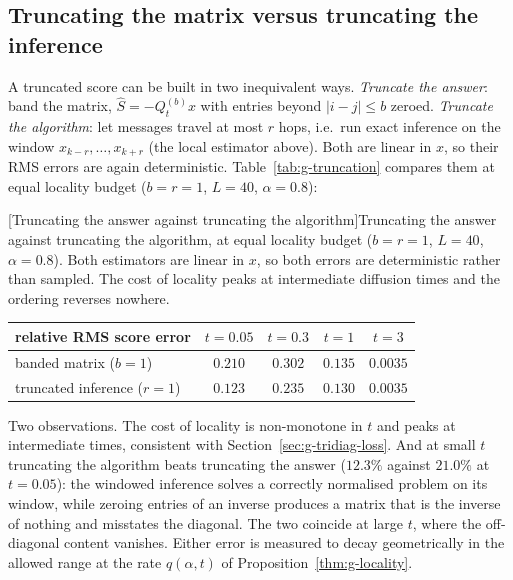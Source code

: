 \subsection{Truncating the matrix versus truncating the inference}

A truncated score can be built in two inequivalent ways.
\emph{Truncate the answer}: band the matrix,
$\widehat S = -Q_t^{(b)} x$ with entries beyond $|i-j| \leq b$ zeroed.
\emph{Truncate the algorithm}: let messages travel at most $r$ hops, i.e.\
run exact inference on the window $x_{k-r}, \dots, x_{k+r}$ (the local
estimator above). Both are linear in $x$, so their RMS errors are again
deterministic. Table~\ref{tab:g-truncation} compares them at equal locality
budget ($b = r = 1$, $L = 40$, $\alpha = 0.8$):
\begin{center}
\begin{minipage}{\linewidth}\centering
{}[Truncating the answer against truncating the algorithm]{Truncating the answer against truncating the algorithm, at equal locality budget ($b = r = 1$, $L = 40$, $\alpha = 0.8$). Both estimators are linear in $x$, so both errors are deterministic rather than sampled. The cost of locality peaks at intermediate diffusion times and the ordering reverses nowhere.}
\label{tab:g-truncation}
\begin{tabular}{@{}lcccc@{}}
\toprule
relative RMS score error & $t = 0.05$ & $t = 0.3$ & $t = 1$ & $t = 3$ \\
\midrule
banded matrix ($b = 1$)      & $0.210$ & $0.302$ & $0.135$ & $0.0035$ \\
truncated inference ($r = 1$) & $0.123$ & $0.235$ & $0.130$ & $0.0035$ \\
\bottomrule
\end{tabular}
\end{minipage}
\end{center}
Two observations. The cost of locality is non-monotone in $t$ and peaks at
intermediate times, consistent with Section~\ref{sec:g-tridiag-loss}. And
at small $t$ truncating the algorithm beats truncating the answer
($12.3\%$ against $21.0\%$ at $t = 0.05$): the windowed inference solves a
correctly normalised problem on its window, while zeroing entries of an
inverse produces a matrix that is the inverse of nothing and misstates the
diagonal. The two coincide at large $t$, where the off-diagonal content
vanishes. Either error is measured to decay geometrically in the allowed
range at the rate $q(\alpha, t)$ of Proposition~\ref{thm:g-locality}.
